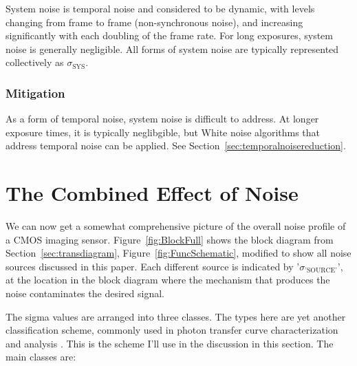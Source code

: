 \documentclass[10pt]{article}
\begin{document}
System noise is temporal noise and considered to be dynamic, with levels changing from frame to frame (non-synchronous noise), and increasing significantly with each doubling of the frame rate. For long exposures, system noise is generally negligible. All forms of system noise are typically represented collectively as $\sigma_{\text{SYS}}$.

\subsubsection{Mitigation}

As a form of temporal noise, system noise is difficult to address. At longer exposure times, it is typically neglibgible, but White noise algorithms that address temporal noise can be applied. See Section~\ref{sec:temporalnoisereduction}.

\section{The Combined Effect of Noise}
\label{sec:combinednoise}

We can now get a somewhat comprehensive picture of the overall noise profile of a CMOS imaging sensor. Figure~\ref{fig:BlockFull} shows the block diagram from Section~\ref{sec:transdiagram}, Figure~\ref{fig:FuncSchematic}, modified to show all noise sources discussed in this paper. Each different source is indicated by '$\sigma_{\text{'SOURCE'}}$', at the location in the block diagram where the mechanism that produces the noise contaminates the desired signal. 

The sigma values are arranged into three classes. The types here are yet another classification scheme, commonly used in photon transfer curve characterization and analysis \cite{janesick}. This is the scheme I'll use in the discussion in this section. The main classes are:
\end{document}
